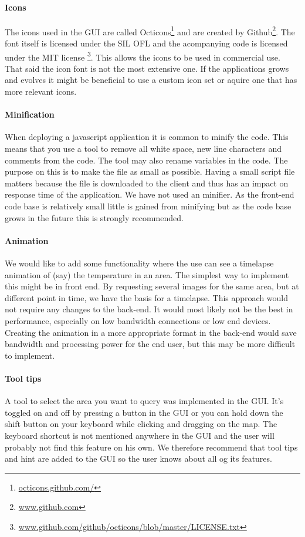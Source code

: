 \documentclass[11pt,a4paper,titlepage,oneside]{report}
\begin{document}
\paragraph{Icons}
The icons used in the GUI are called Octicons\footnote{\url{octicons.github.com/}} and are created by Github\footnote{\url{www.github.com}}. The font itself is licensed under the SIL OFL and the acompanying code is licensed under the MIT license \footnote{\url{www.github.com/github/octicons/blob/master/LICENSE.txt}}. This allows the icons to be used in commercial use. That said the icon font is not the most extensive one. If the applications grows and evolves it might be beneficial to use a custom icon set or aquire one that has more relevant icons.

\paragraph{Minification}
When deploying a javascript application it is common to minify the code. This means that you use a tool to remove all white space, new line characters and comments from the code. The tool may also rename variables in the code. The purpose on this is to make the file as small as possible. Having a small script file matters because the file is downloaded to the client and thus has an impact on response time of the application. We have not used an minifier. As the \gls{front-end} code base is relatively small little is gained from minifying but as the code base grows in the future this is strongly recommended.

\paragraph{Animation}
We would like to add some functionality where the use can see a timelapse animation of (say) the temperature in an area. The simplest way to implement this might be in front end. By requesting several images for the same area, but at different point in time, we have the basis for a timelapse. This approach would not require any changes to the back-end. It would most likely not be the best in performance, especially on low bandwidth connections or low end devices. Creating the animation in a more appropriate format in the back-end would save bandwidth and processing power for the end user, but this may be more difficult to implement.

\paragraph{Tool tips}
A tool to select the area you want to query was implemented in the \gls{GUI}. It's toggled on and off by pressing a button in the \gls{GUI} or you can hold down the shift button on your keyboard while clicking and dragging on the map. The keyboard shortcut is not mentioned anywhere in the \gls{GUI} and the user will probably not find this feature on his own. We therefore recommend that tool tips and hint are added to the \gls{GUI} so the user knows about all og its features.
\end{document}
